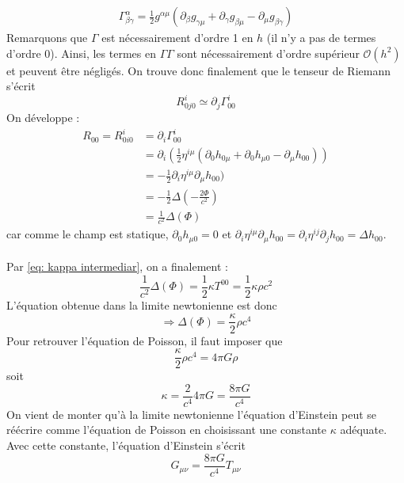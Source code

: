 \begin{align}
    \Gamma^{\alpha}_{\beta \gamma} = \frac{1}{2}g^{\alpha \mu}(\partial_{\beta}g_{\gamma \mu} +\partial_{\gamma}g_{\beta \mu} - \partial_{\mu}g_{\beta \gamma})
\end{align}
Remarquons que $\Gamma$ est nécessairement d'ordre 1 en $h$ (il n'y a pas de termes d'ordre $0$). Ainsi, les termes en $\Gamma \Gamma$ sont nécessairement d'ordre supérieur $\mathcal{O}(h^2)$ et peuvent être négligés. On trouve donc finalement que le tenseur de Riemann s'écrit
\begin{equation}
    R^{i}_{0j0} \simeq \partial_{j}\Gamma^{i}_{00}
\end{equation}
On développe : 
\begin{align}
    R_{00}= R^{i}_{0i0} &= \partial_{i}\Gamma^{i}_{00}\\
    &= \partial_{i}\left(\frac{1}{2}\eta^{i \mu}(\partial_{0}h_{0 \mu} + \partial_{0}h_{\mu 0} - \partial_{\mu}h_{00})\right)\\
    &= -\frac{1}{2}\partial_{i}\eta^{i \mu}\partial_{\mu}h_{00})\\
    & = -\frac{1}{2}\Delta(-\frac{2 \Phi}{c^2})\\
    & = \frac{1}{c^2}\Delta(\Phi)
\end{align}
car comme le champ est statique, $\partial_{0}h_{\mu 0} = 0$ et $\partial_{i}\eta^{i \mu}\partial_{\mu} h_{00}= \partial_{i}\eta^{i j}\partial_{j} h_{00}=\Delta h_{00}$.\\
\\
Par \ref{eq: kappa intermediar}, on a finalement :
\begin{equation}
    \frac{1}{c^2}\Delta(\Phi) = \frac{1}{2}\kappa T^{00} = \frac{1}{2}\kappa \rho c^2
\end{equation}
L'équation obtenue dans la limite newtonienne est donc
\begin{equation}
    \Rightarrow \Delta(\Phi) =  \frac{\kappa}{2} \rho c^4
\end{equation}
Pour retrouver l'équation de Poisson, il faut imposer que
 \begin{equation}
      \frac{\kappa}{2} \rho c^4 = 4 \pi G\rho
 \end{equation}
soit
\begin{equation}
    \kappa = \frac{2}{c^4}4\pi G = \frac{8 \pi G}{c^4}
\end{equation}
On vient de monter qu'à la limite newtonienne l'équation d'Einstein peut se réécrire comme l'équation de Poisson en choisissant une constante $\kappa$ adéquate. Avec cette constante, l'équation d'Einstein s'écrit
\begin{equation}
    G_{\mu \nu} = \frac{8 \pi G}{c^4}T_{\mu \nu}
\end{equation}


